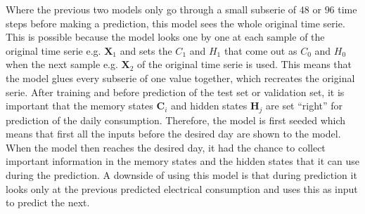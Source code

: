 Where the previous two models only go through a small subserie of $ 48 $ or $ 96 $ time steps before making a prediction, this model sees the whole original time serie. This is possible because the model looks one by one at each sample of the original time serie e.g. $ \bm{X}_{1} $ and sets the $ C_{1} $ and $ H_{1} $ that come out as $ C_{0} $ and $ H_{0} $ when the next sample e.g. $ \bm{X}_{2}  $ of the original time serie is used. This means that the model glues every subserie of one value together, which recreates the original serie. After training and before prediction of the test set or validation set, it is important that the memory states $ \bm{C}_{i} $  and hidden states $ \bm{H}_{j} $ are set ``right'' for prediction of the daily consumption. Therefore, the model is first seeded which means that first all the inputs before the desired day are shown to the model. When the model then reaches the desired day, it had the chance to collect important information in the memory states and the hidden states that it can use during the prediction. A downside of using this model is that during prediction it looks only at the previous predicted electrical consumption and uses this as input to predict the next.





%



